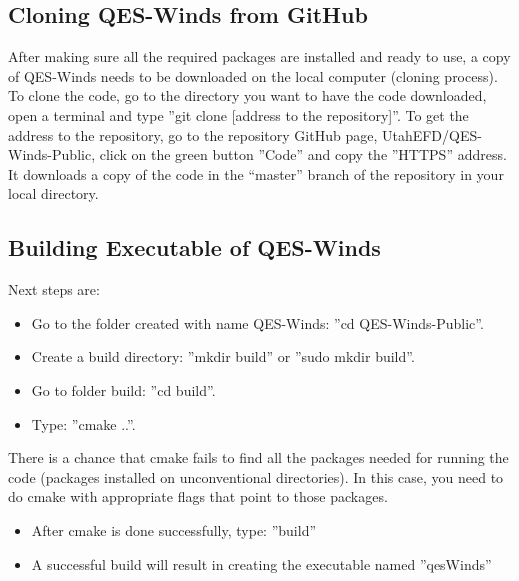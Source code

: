 \subsection{Cloning QES-Winds from GitHub}

After making sure all the required packages are installed and ready to use, a copy of QES-Winds needs to be downloaded on the local computer (cloning process). To clone the code, go to the directory you want to have the code downloaded, open a terminal and type ''git clone [address to the repository]''. To get the address to the repository, go to the repository GitHub page, UtahEFD/QES-Winds-Public, click on the green button ''Code'' and copy the ''HTTPS'' address. It downloads a copy of the code in the “master” branch of the repository in your local directory.

\subsection{Building Executable of QES-Winds}

Next steps are:
\begin{itemize}
    \item Go to the folder created with name QES-Winds: ''cd QES-Winds-Public''.
    \item Create a build directory: ''mkdir build'' or ''sudo mkdir build''.
    \item Go to folder build: ''cd build''.
    \item Type: ''cmake ..''.
\end{itemize}

There is a chance that cmake fails to find all the packages needed for running the code (packages installed on unconventional directories). In this case, you need to do cmake with appropriate flags that point to those packages.

\begin{itemize}
    \item After cmake is done successfully, type: ''build''
    \item A successful build will result in creating the executable named ''qesWinds''
\end{itemize}
